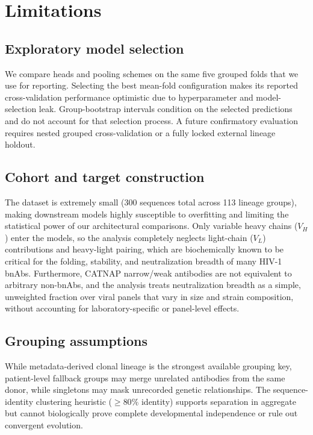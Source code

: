 \section{Limitations}
\label{sec:limitations}

\subsection{Exploratory model selection}
We compare heads and pooling schemes on the same five grouped folds that we use
for reporting. Selecting the best mean-fold configuration makes its reported
cross-validation performance optimistic due to hyperparameter and
model-selection leak. Group-bootstrap intervals condition on the selected
predictions and do not account for that selection process. A future confirmatory
evaluation requires nested grouped cross-validation or a fully locked external
lineage holdout.

\subsection{Cohort and target construction}
The dataset is extremely small (300 sequences total across 113 lineage groups),
making downstream models highly susceptible to overfitting and limiting the
statistical power of our architectural comparisons. Only variable heavy chains
($V_H$) enter the models, so the analysis completely neglects light-chain ($V_L$) contributions and
heavy-light pairing, which are biochemically known to be critical for the
folding, stability, and neutralization breadth of many HIV-1 bnAbs. Furthermore,
CATNAP narrow/weak antibodies are not equivalent to arbitrary non-bnAbs, and the
analysis treats neutralization breadth as a simple, unweighted fraction over viral
panels that vary in size and strain composition, without accounting for
laboratory-specific or panel-level effects.

\subsection{Grouping assumptions}
While metadata-derived clonal lineage is the strongest available grouping key,
patient-level fallback groups may merge unrelated antibodies from the same
donor, while singletons may mask unrecorded genetic relationships. The
sequence-identity clustering heuristic ($\geq 80\%$ identity) supports
separation in aggregate but cannot biologically prove complete developmental
independence or rule out convergent evolution.

